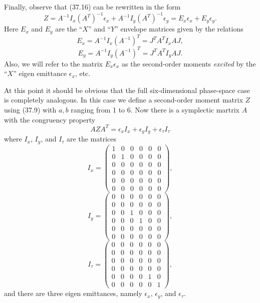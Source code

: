 Finally, observe that (37.16) can be rewritten in the form
\begin{equation}
Z = A^{-1} I_x (A^T)^{-1}  \epsilon_x + A^{-1} I_y (A^T)^{-1}  \epsilon_y = E_x\epsilon_x + E_y\epsilon_y .
\end{equation}
Here $E_x$ and $E_y$ are the ``$X$'' and ``$Y$'' envelope matrices given by the relations
\begin{equation}
E_x = A^{-1}  I_x (A^{-1})^T  = J^TA^TI_xAJ,
\end{equation}
\begin{equation}
E_y = A^{-1} I_y (A^{-1})^T = J^TA^TI_y AJ.
\end{equation}
Also, we will refer to the matrix $E_x\epsilon_x$ as the second-order moments {\em excited} by the ``$X$'' eigen emittance $\epsilon_x$, etc.

At this point it should be obvious that the full six-dimensional phase-space case is completely analogous.  In this case we define a second-order moment matrix $Z$ using (37.9) with $a,b$ ranging from 1 to 6.  Now there is a symplectic martrix $A$ with the congruency property
\begin{equation}
AZA^T = \epsilon_x I_x + \epsilon_yI_y + \epsilon_{\tau} I_{\tau}
\end{equation}
where $I_x$, $I_y$, and $I_{\tau}$ are the matrices
\begin{equation}
I_x = \left( \begin{array}{cccccc} 1 & 0 & 0 & 0 &0 & 0 \\
0 & 1 & 0 & 0 & 0 &0 \\
0 & 0 & 0 & 0 & 0 &0 \\
0 & 0 & 0 & 0 & 0 &0 \\
0 & 0 & 0 & 0 & 0 &0 \\
0 & 0 & 0 & 0 & 0 &0 \end{array}\right) ,
\end{equation}
\begin{equation}
I_y = \left( \begin{array}{cccccc} 0 & 0 & 0 & 0 &0 & 0 \\
0 & 0 & 0 & 0 & 0 &0 \\
0 & 0 & 1 & 0 & 0 &0 \\
0 & 0 & 0 & 1 & 0 &0 \\
0 & 0 & 0 & 0 & 0 &0 \\
0 & 0 & 0 & 0 & 0 &0 \end{array}\right) ,
\end{equation}
\begin{equation}
I_{\tau} = \left( \begin{array}{cccccc} 0 & 0 & 0 & 0 &0 & 0 \\
0 & 0 & 0 & 0 & 0 &0 \\
0 & 0 & 0 & 0 & 0 &0 \\
0 & 0 & 0 & 0 & 0 &0 \\
0 & 0 & 0 & 0 & 1 &0 \\
0 & 0 & 0 & 0 & 0 &1 \end{array}\right) ,
\end{equation}
and there are three eigen emittances, namely $\epsilon_x$, $\epsilon_y$, and $\epsilon_{\tau}$.

